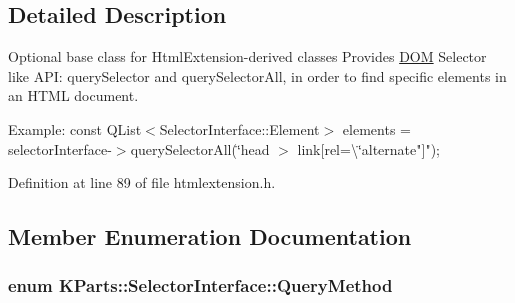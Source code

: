\subsection{Detailed Description}
Optional base class for Html\+Extension-\/derived classes Provides \hyperlink{namespaceDOM}{D\+O\+M} Selector like A\+P\+I\+: query\+Selector and query\+Selector\+All, in order to find specific elements in an H\+T\+M\+L document.

Example\+: {\ttfamily  const Q\+List$<$\+Selector\+Interface\+::\+Element$>$ elements = selector\+Interface-\/$>$query\+Selector\+All(\char`\"{}head $>$ link\mbox{[}rel=\textbackslash{}\char`\"{}alternate"\mbox{]}"); } 

Definition at line 89 of file htmlextension.\+h.



\subsection{Member Enumeration Documentation}
\hypertarget{classKParts_1_1SelectorInterface_a90fe11660661a423709a52c91a969dce}{
\subsubsection[{Query\+Method}]{\setlength{\rightskip}{0pt plus 5cm}enum {\bf K\+Parts\+::\+Selector\+Interface\+::\+Query\+Method}}}\label{classKParts_1_1SelectorInterface_a90fe11660661a423709a52c91a969dce}
